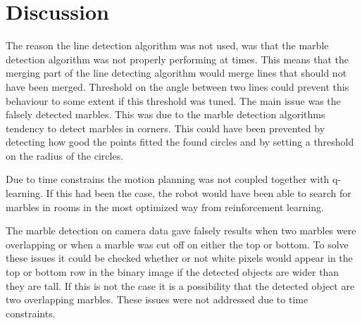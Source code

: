 \documentclass[../Head/Main.tex]{subfiles}
\begin{document}
\section{Discussion}

The reason the line detection algorithm was not used, was that the marble detection algorithm was not properly performing at times. This means that the merging part of the line detecting algorithm would merge lines that should not have been merged. Threshold on the angle between two lines could prevent this behaviour to some extent if this threshold was tuned. The main issue was the falsely detected marbles. This was due to the marble detection algorithms tendency to detect marbles in corners. This could have been prevented by detecting how good the points fitted the found circles and by setting a threshold on the radius of the circles. 

Due to time constrains the motion planning was not coupled together with q-learning. If this had been the case, the robot would have been able to search for marbles in rooms in the most optimized way from reinforcement learning. 

The marble detection on camera data gave falsely results when two marbles were overlapping or when a marble was cut off on either the top or bottom. To solve these issues it could be checked whether or not white pixels would appear in the top or bottom row in the binary image if the detected objects are wider than they are tall. If this is not the case it is a possibility that the detected object are two overlapping marbles. These issues were not addressed due to time constraints. 



   
\end{document}

